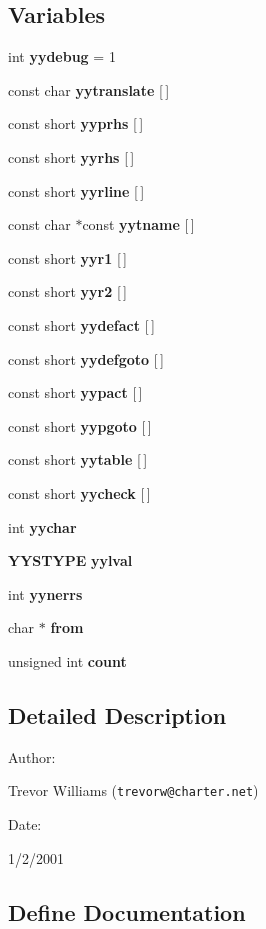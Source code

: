 \subsection*{Variables}
\begin{CompactItemize}
\item 
int {\bf yydebug} = 1
\item 
const char {\bf yytranslate} [$\,$]
\item 
const short {\bf yyprhs} [$\,$]
\item 
const short {\bf yyrhs} [$\,$]
\item 
const short {\bf yyrline} [$\,$]
\item 
const char $\ast$const {\bf yytname} [$\,$]
\item 
const short {\bf yyr1} [$\,$]
\item 
const short {\bf yyr2} [$\,$]
\item 
const short {\bf yydefact} [$\,$]
\item 
const short {\bf yydefgoto} [$\,$]
\item 
const short {\bf yypact} [$\,$]
\item 
const short {\bf yypgoto} [$\,$]
\item 
const short {\bf yytable} [$\,$]
\item 
const short {\bf yycheck} [$\,$]
\item 
int {\bf yychar}
\item 
{\bf YYSTYPE} {\bf yylval}
\item 
int {\bf yynerrs}
\item 
char $\ast$ {\bf from}
\item 
unsigned int {\bf count}
\end{CompactItemize}


\subsection{Detailed Description}


\begin{Desc}
\item[Author: ]\par
Trevor Williams ({\tt trevorw@charter.net}) \end{Desc}
\begin{Desc}
\item[Date: ]\par
1/2/2001\end{Desc}


\subsection{Define Documentation}
